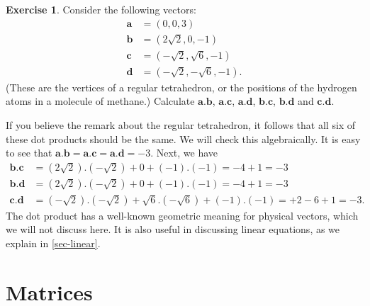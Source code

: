\documentclass[a4paper]{book}
\newcommand{\rs}        {\sqrt{6}}
\newcommand{\rt}        {\sqrt{2}}
\newcommand{\VEC}[1]    {\mathbf{#1}}
\renewcommand{\:}{\colon}
\theoremstyle{definition}
\newtheorem{exercise}[theorem]{Exercise}
\renewenvironment{solution}{\SolutionInline}{\endSolutionInline}
\begin{document}
\begin{exercise}
 Consider the following vectors:
 \begin{align*}
  \VEC{a} &= (0,0,3) \\
  \VEC{b} &= (2\rt,0,-1) \\
  \VEC{c} &= (-\rt,\rs,-1) \\
  \VEC{d} &= (-\rt,-\rs,-1).
 \end{align*}
 (These are the vertices of a regular tetrahedron, or the positions of
 the hydrogen atoms in a molecule of methane.)  Calculate
 $\VEC{a}.\VEC{b}$,  $\VEC{a}.\VEC{c}$,  $\VEC{a}.\VEC{d}$,
 $\VEC{b}.\VEC{c}$,  $\VEC{b}.\VEC{d}$ and  $\VEC{c}.\VEC{d}$.
\end{exercise}
\begin{solution}
 If you believe the remark about the regular tetrahedron, it follows
 that all six of these dot products should be the same.  We will check
 this algebraically.  It is easy to see that 
 $\VEC{a}.\VEC{b}=\VEC{a}.\VEC{c}=\VEC{a}.\VEC{d}=-3$.  Next, we have
 \begin{align*}
  \VEC{b}.\VEC{c} &= (2\rt).(-\rt) + 0 + (-1).(-1) = -4+1 = -3 \\
  \VEC{b}.\VEC{d} &= (2\rt).(-\rt) + 0 + (-1).(-1) = -4+1 = -3 \\
  \VEC{c}.\VEC{d} &= (-\rt).(-\rt) + \rs.(-\rs) + (-1).(-1) =
                     +2-6+1 = -3.
 \end{align*}
\end{solution}
The dot product has a well-known geometric meaning for physical
vectors, which we will not discuss here.  It is also useful in
discussing linear equations, as we explain in \autoref{sec-linear}.

\section{Matrices}
\label{sec-matrices}
\end{document}
